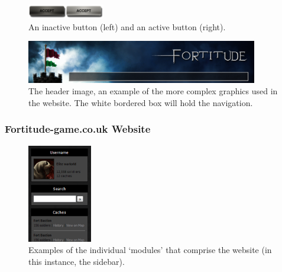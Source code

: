 \begin{figure}[ht]
	\vspace{-10pt}
	\begin{center}
	\includegraphics[width=0.3\textwidth]{images/buttons}
	\vspace{-10pt}
	\caption{An inactive button (left) and an active button (right).}
	\label{buttons}
	\end{center}
\end{figure}

\begin{figure}[ht]
	\begin{center}
	\includegraphics[width=0.9\textwidth]{images/website_header_background}
	\caption{The header image, an example of the more complex graphics used in the website. The white bordered box will hold the navigation.}
	\label{website_header_background}
	\end{center}
	\vspace{-20pt}
\end{figure}

\subsubsection{Fortitude-game.co.uk Website}

\begin{figure}
	\vspace{-15pt}
	\begin{center}
	\includegraphics[width=0.25\textwidth]{images/sidebar_modules}
	\caption{Examples of the individual ‘modules’ that comprise the website (in this instance, the sidebar).}
	\label{sidebar_modules}
	\end{center}
	\vspace{-20pt}
\end{figure}

